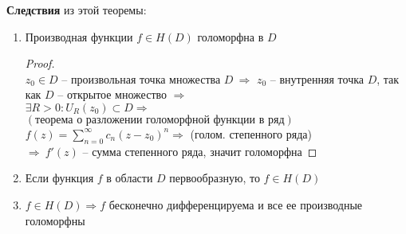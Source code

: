\textbf{Следствия} из этой теоремы:
\begin{enumerate}
    \item Производная функции $f\in H(D)$ голоморфна в $D$
    \begin{proof}
        \ \\
        $z_0 \in D$ -- произвольная точка множества $D \ \Rightarrow$ $z_0$ -- внутренняя точка $D$, 
        так как $D$ -- открытое множество $\Rightarrow$ \\[2mm]
        $\exists R > 0: U_R(z_0) \subset D \Rightarrow$ \\[2mm]
        $(\text{теорема о разложении голоморфной функции в ряд})$ \\[2mm] 
        $f(z) = \sum_{n=0}^{\infty}c_n (z - z_0)^n \Rightarrow$ (голом. степенного ряда)\\[2mm]
        $\Rightarrow \ f'(z)$ -- сумма степенного ряда, значит голоморфна 
    \end{proof}
    \item Если функция $f$ в области $D$ первообразную, то $f \in H(D)$
    \item $f \in H(D) \Rightarrow f$ бесконечно дифференцируема и все ее производные голоморфны
\end{enumerate}
